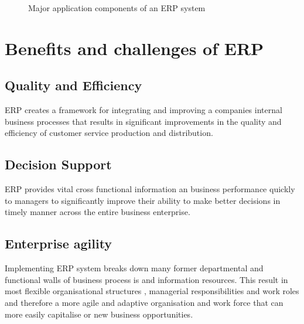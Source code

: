 \documentclass[12pt, a4paper]{article}
\begin{document}
\vskip10pt
\begin{table}[ht]
\end{table}
\begin{figure}[h]
  \caption{Major application components of an ERP system}
\end{figure}

\section{Benefits and challenges of ERP}
\subsection{Quality and Efficiency}
ERP creates a framework for integrating and improving a companies internal business processes that results in significant improvements in the quality and efficiency of customer service production and distribution.

\subsection{Decision Support}
ERP provides vital cross functional information an business performance quickly to managers to significantly improve their ability to make better decisions in timely manner across the entire business enterprise.

\subsection{Enterprise agility}
Implementing ERP system breaks down many former departmental and functional walls of business process is and information resources. This result in most flexible organisational structures , managerial responsibilities and work roles and therefore a more agile and adaptive organisation and work force that can more easily capitalise or new business opportunities.
\end{document}
